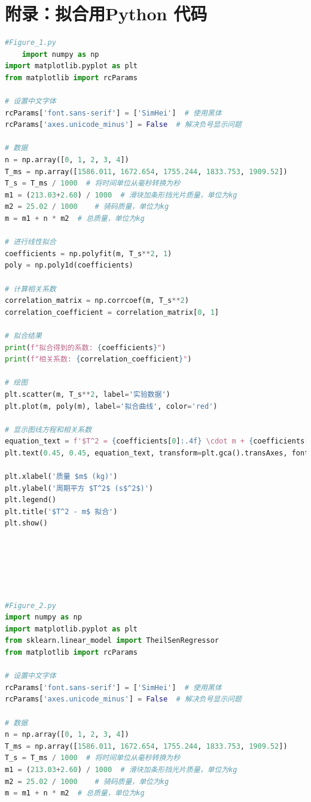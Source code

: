 \documentclass[UTF8]{article}
\theoremstyle{MyLineTheoremStyle} %
\theoremstyle{MyBlockTheoremStyle} %
\theoremstyle{MySubsubsectionStyle} %
\begin{document}
\cleardoublepage
\section{附录：拟合用Python 代码}

\begin{lstlisting}[language=Python, caption=Figure's Python code, label=code:python_example]
#Figure_1.py
    import numpy as np
import matplotlib.pyplot as plt
from matplotlib import rcParams

# 设置中文字体
rcParams['font.sans-serif'] = ['SimHei']  # 使用黑体
rcParams['axes.unicode_minus'] = False  # 解决负号显示问题

# 数据
n = np.array([0, 1, 2, 3, 4])
T_ms = np.array([1586.011, 1672.654, 1755.244, 1833.753, 1909.52])
T_s = T_ms / 1000  # 将时间单位从毫秒转换为秒
m1 = (213.03+2.60) / 1000  # 滑块加条形挡光片质量，单位为kg
m2 = 25.02 / 1000    # 骑码质量，单位为kg
m = m1 + n * m2  # 总质量，单位为kg

# 进行线性拟合
coefficients = np.polyfit(m, T_s**2, 1)
poly = np.poly1d(coefficients)

# 计算相关系数
correlation_matrix = np.corrcoef(m, T_s**2)
correlation_coefficient = correlation_matrix[0, 1]

# 拟合结果
print(f"拟合得到的系数: {coefficients}")
print(f"相关系数: {correlation_coefficient}")

# 绘图
plt.scatter(m, T_s**2, label='实验数据')
plt.plot(m, poly(m), label='拟合曲线', color='red')

# 显示图线方程和相关系数
equation_text = f'$T^2 = {coefficients[0]:.4f} \cdot m + {coefficients[1]:.4f}$\n相关系数: {correlation_coefficient:.4f}'
plt.text(0.45, 0.45, equation_text, transform=plt.gca().transAxes, fontsize=12, verticalalignment='top')

plt.xlabel('质量 $m$ (kg)')
plt.ylabel('周期平方 $T^2$ (s$^2$)')
plt.legend()
plt.title('$T^2 - m$ 拟合')
plt.show()






#Figure_2.py
import numpy as np
import matplotlib.pyplot as plt
from sklearn.linear_model import TheilSenRegressor
from matplotlib import rcParams

# 设置中文字体
rcParams['font.sans-serif'] = ['SimHei']  # 使用黑体
rcParams['axes.unicode_minus'] = False  # 解决负号显示问题

# 数据
n = np.array([0, 1, 2, 3, 4])
T_ms = np.array([1586.011, 1672.654, 1755.244, 1833.753, 1909.52])
T_s = T_ms / 1000  # 将时间单位从毫秒转换为秒
m1 = (213.03+2.60) / 1000  # 滑块加条形挡光片质量，单位为kg
m2 = 25.02 / 1000    # 骑码质量，单位为kg
m = m1 + n * m2  # 总质量，单位为kg


\end{lstlisting}
\end{document}
